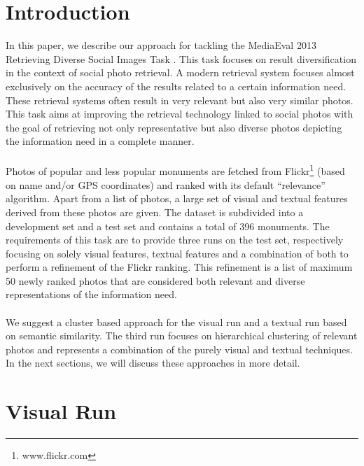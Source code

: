\documentclass{acm_proc_article-me11_tweaked}
\begin{document}
\section{Introduction}
In this paper, we describe our approach for tackling the MediaEval 2013 Retrieving Diverse Social Images Task \cite{mediaeval-diversephotos}.
This task focuses on result diversification in the context of social photo retrieval. 
A modern retrieval system focuses almost exclusively on the accuracy of the results related to a certain information need. 
These retrieval systems often result in very relevant but also very similar photos.
This task aims at improving the retrieval technology linked to social photos with the goal of retrieving not only representative but also diverse photos depicting the information need in a complete manner.
\\\\
Photos of popular and less popular monuments are fetched from Flickr\footnote{www.flickr.com} (based on name and/or GPS coordinates) and ranked with its default ``relevance'' algorithm.
Apart from a list of photos, a large set of visual and textual features derived from these photos are given.
The dataset is subdivided into a development set and a test set and contains a total of 396 monuments.
The requirements of this task are to provide three runs on the test set, respectively focusing on solely visual features, textual features and a combination of both to perform a refinement of the Flickr ranking.
This refinement is a list of maximum 50 newly ranked photos that are considered both relevant and diverse representations of the information need.
\\\\
We suggest a cluster based approach for the visual run and a textual run based on semantic similarity.
The third run focuses on hierarchical clustering of relevant photos and represents a combination of the purely visual and textual techniques.
In the next sections, we will discuss these approaches in more detail.

\section{Visual Run}
\end{document}
